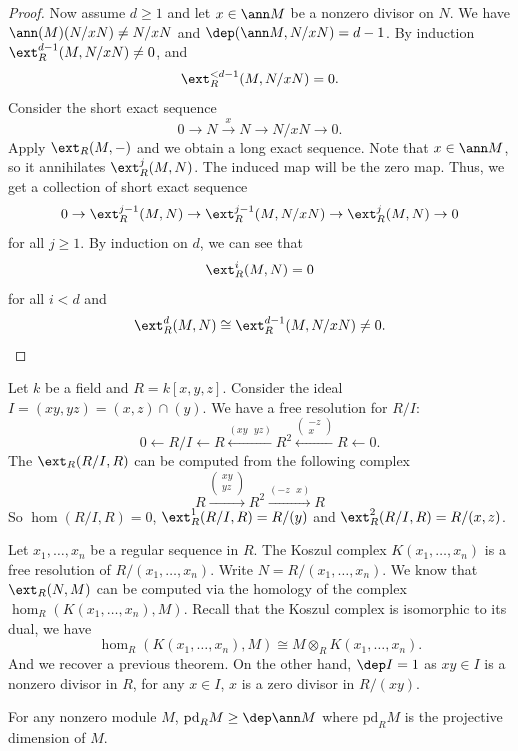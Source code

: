 \begin{proof}
    Now assume \(d\geq 1\) and let \(x\in \ann M\) be a nonzero divisor on \(N\). We have \(\ann(M)(N/xN)\neq N/xN\) and \(\dep(\ann M,N/xN)=d-1\). By induction \(\ext^{d-1}_R(M,N/xN)\neq 0\), and 
    \[\ext^{<d-1}_R(M,N/xN)=0.\]
    Consider the short exact sequence
    \[0\rightarrow N\xrightarrow{x}N\rightarrow N/xN\rightarrow 0.\]
    Apply \(\ext_R(M,-)\) and we obtain a long exact sequence. Note that \(x\in \ann M\), so it annihilates \(\ext^j_R(M,N)\). The induced map will be the zero map. Thus, we get a collection of short exact sequence
    \[0\rightarrow \ext^{j-1}_R(M,N)\rightarrow \ext^{j-1}_R(M,N/xN)\rightarrow \ext^j_R(M,N)\rightarrow 0\]
    for all \(j\geq 1\). By induction on \(d\), we can see that 
    \[\ext^i_R(M,N)=0\]
    for all \(i<d\) and 
    \[\ext^d_R(M,N)\cong \ext^{d-1}_R(M,N/xN)\neq 0.\]
\end{proof}

\begin{example}
    Let \(k\) be a field and \(R=k[x,y,z]\). Consider the ideal \(I=(xy,yz)=(x,z)\cap (y)\). We have a free resolution for \(R/I\):
    \[0\leftarrow R/I\leftarrow R\xleftarrow{(xy\ \ \ yz)} R^2\xleftarrow{\begin{pmatrix} -z\\ x\end{pmatrix}}R\leftarrow 0.\]
    The \(\ext_R(R/I,R)\) can be computed from the following complex 
    \[R\xrightarrow{\begin{pmatrix} xy\\ yz \end{pmatrix}} R^2\xrightarrow{(-z\ \ \ x)}R\]
    So \(\hom(R/I,R)=0\), \(\ext^1_R(R/I,R)=R/(y)\) and \(\ext^2_R(R/I,R)=R/(x,z)\).
\end{example}

\begin{example}
    Let \(x_1,\ldots,x_n\) be a regular sequence in \(R\). The Koszul complex \(K(x_1,\ldots,x_n)\) is a free resolution of \(R/(x_1,\ldots,x_n)\). Write \(N=R/(x_1,\ldots,x_n)\). We know that \(\ext_R(N,M)\) can be computed via the homology of the complex \(\hom_R(K(x_1,\ldots,x_n),M)\). Recall that the Koszul complex is isomorphic to its dual, we have 
    \[\hom_R(K(x_1,\ldots,x_n),M)\cong M\otimes_R K(x_1,\ldots,x_n).\]
    And we recover a previous theorem. On the other hand, \(\dep I=1\) as \(xy\in I\) is a nonzero divisor in \(R\), for any \(x\in I\), \(x\) is a zero divisor in \(R/(xy)\). 
\end{example}

\begin{corollary}
  For any nonzero module \(M\), \(\mathrm{pd}_R M\geq \dep \ann M\) where \(\mathrm{pd}_R M\) is the projective dimension of \(M\).
\end{corollary}

